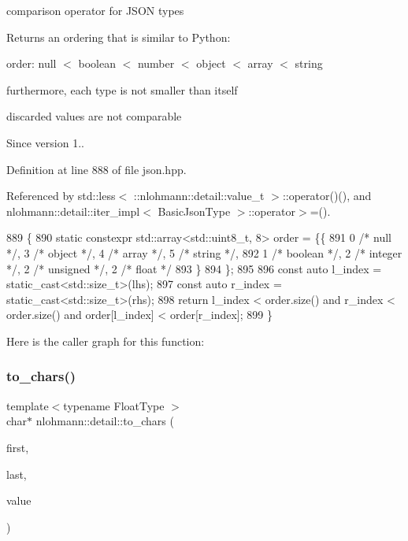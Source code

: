 comparison operator for J\+S\+ON types 

Returns an ordering that is similar to Python\+:
\begin{DoxyItemize}
\item order\+: null $<$ boolean $<$ number $<$ object $<$ array $<$ string
\item furthermore, each type is not smaller than itself
\item discarded values are not comparable
\end{DoxyItemize}

\begin{DoxySince}{Since}
version 1.. 
\end{DoxySince}


Definition at line 888 of file json.\+hpp.



Referenced by std\+::less$<$ \+::nlohmann\+::detail\+::value\+\_\+t $>$\+::operator()(), and nlohmann\+::detail\+::iter\+\_\+impl$<$ Basic\+Json\+Type $>$\+::operator$>$=().


\begin{DoxyCode}
889 \{
890     \textcolor{keyword}{static} constexpr std::array<std::uint8\_t, 8> order = \{\{
891             0 \textcolor{comment}{/* null */}, 3 \textcolor{comment}{/* object */}, 4 \textcolor{comment}{/* array */}, 5 \textcolor{comment}{/* string */},
892             1 \textcolor{comment}{/* boolean */}, 2 \textcolor{comment}{/* integer */}, 2 \textcolor{comment}{/* unsigned */}, 2 \textcolor{comment}{/* float */}
893         \}
894     \};
895 
896     \textcolor{keyword}{const} \textcolor{keyword}{auto} l\_index = \textcolor{keyword}{static\_cast<}std::size\_t\textcolor{keyword}{>}(lhs);
897     \textcolor{keyword}{const} \textcolor{keyword}{auto} r\_index = \textcolor{keyword}{static\_cast<}std::size\_t\textcolor{keyword}{>}(rhs);
898     \textcolor{keywordflow}{return} l\_index < order.size() and r\_index < order.size() and order[l\_index] < order[r\_index];
899 \}
\end{DoxyCode}
Here is the caller graph for this function\+:
\mbox{\label{namespacenlohmann_1_1detail_a6192f1eab05fbbc5c35edb8368c8fc57}} 
\subsubsection{\texorpdfstring{to\+\_\+chars()}{to\_chars()}}
{\footnotesize\ttfamily template$<$typename Float\+Type $>$ \\
char$\ast$ nlohmann\+::detail\+::to\+\_\+chars (\begin{DoxyParamCaption}\item[{char $\ast$}]{first,  }\item[{char $\ast$}]{last,  }\item[{Float\+Type}]{value }\end{DoxyParamCaption})}



